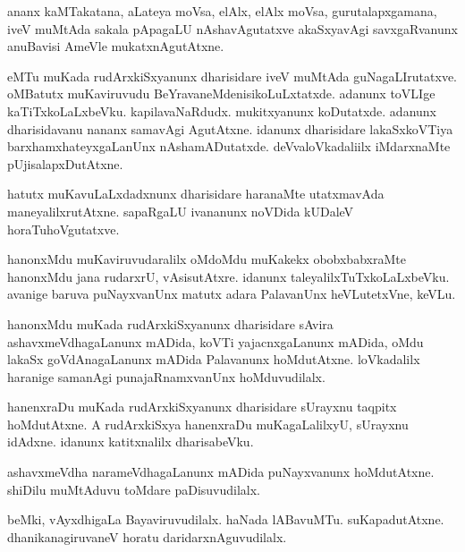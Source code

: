 \documentclass{article}
\begin{document}
\begin{mng}%
ananx kaMTakatana, aLateya moVsa, elAlx, elAlx moVsa, 
gurutalapxgamana, iveV muMtAda sakala pApagaLU nAshavAgutatxve 
akaSxyavAgi savxgaRvanunx anuBavisi AmeVle mukatxnAgutAtxne.
\end{mng}

\begin{mng}%
eMTu muKada rudArxkiSxyanunx dharisidare iveV muMtAda 
guNagaLIrutatxve. oMBatutx muKaviruvudu BeYravaneMdenisikoLuLxtatxde. 
adanunx toVLIge kaTiTxkoLaLxbeVku. kapilavaNaRdudx. mukitxyanunx 
koDutatxde. adanunx dharisidavanu nananx samavAgi AgutAtxne. idanunx 
dharisidare lakaSxkoVTiya barxhamxhateyxgaLanUnx nAshamADutatxde. 
deVvaloVkadaliilx iMdarxnaMte pUjisalapxDutAtxne.
\end{mng}

\begin{mng}%
hatutx muKavuLaLxdadxnunx dharisidare haranaMte utatxmavAda 
maneyalilxrutAtxne. sapaRgaLU ivananunx noVDida kUDaleV 
horaTuhoVgutatxve.
\end{mng}

\begin{mng}%
hanonxMdu muKaviruvudaralilx oMdoMdu muKakekx obobxbabxraMte hanonxMdu 
jana rudarxrU, vAsisutAtxre. idanunx taleyalilxTuTxkoLaLxbeVku. 
avanige baruva puNayxvanUnx matutx adara PalavanUnx heVLutetxVne, 
keVLu.
\end{mng}

\begin{mng}%
hanonxMdu muKada rudArxkiSxyanunx dharisidare sAvira 
ashavxmeVdhagaLanunx mADida, koVTi yajacnxgaLanunx mADida, oMdu lakaSx 
goVdAnagaLanunx mADida Palavanunx hoMdutAtxne. loVkadalilx haranige 
samanAgi punajaRnamxvanUnx hoMduvudilalx.
\end{mng}

\begin{mng}%
hanenxraDu muKada rudArxkiSxyanunx dharisidare sUrayxnu taqpitx 
hoMdutAtxne. A rudArxkiSxya hanenxraDu muKagaLalilxyU, sUrayxnu 
idAdxne. idanunx katitxnalilx dharisabeVku.
\end{mng}

\begin{mng}%
ashavxmeVdha narameVdhagaLanunx mADida puNayxvanunx hoMdutAtxne. 
shiDilu muMtAduvu toMdare paDisuvudilalx.
\end{mng}

\begin{mng}%
beMki, vAyxdhigaLa Bayaviruvudilalx. haNada lABavuMTu. suKapadutAtxne. 
dhanikanagiruvaneV horatu daridarxnAguvudilalx.
\end{mng}
\end{document}
